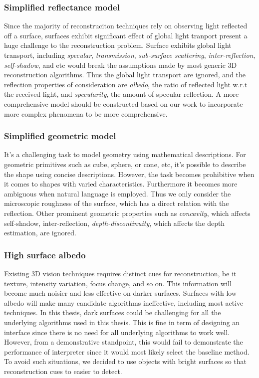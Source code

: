 \subsubsection{Simplified reflectance model}
Since the majority of reconstruciton techniques rely on observing light reflected off a surface, surfaces exhibit significant effect of global light tranport present a huge challenge to the reconstruction problem. Surface exhibits global light transport, including \textit{specular}, \textit{transmission}, \textit{sub-surface scattering}, \textit{inter-reflection}, \textit{self-shadow}, and etc would break the assumptions made by most generic 3D reconstruction algorithms. Thus the global light transport are ignored, and the reflection properties of consideration are \textit{albedo}, \ie the ratio of reflected light w.r.t the received light, and \textit{specularity}, \ie the amount of specular reflection. A more comprehensive model should be constructed based on our work to incorporate more complex phenomena to be more comprehensive.

\subsubsection{Simplified geometric model}
It's a challenging task to model geometry using mathematical descriptions. For geometric primitives such as cube, sphere, or cone, etc, it's possible to describe the shape using concise descriptions. However, the task becomes prohibitive when it comes to shapes with varied characteristics. Furthermore it becomes more ambiguous when natural language is employed. Thus we only consider the microscopic roughness of the surface, which has a direct relation with the reflection. Other prominent geometric properties such as \textit{concavity}, which affects self-shadow, inter-reflection, \textit{depth-discontinuity}, which affects the depth estimation, are ignored.

\subsubsection{High surface albedo}
Existing 3D vision techniques requires distinct cues for reconstruction, be it texture, intensity variation, focus change, and so on. This information will become much noisier and less effective on darker surfaces. Surfaces with low albedo will make many candidate algorithms ineffective, including most active techniques. In this thesis, dark surfaces could be challenging for all the underlying algorithms used in this thesis. This is fine in term of designing an interface since there is no need for all underlying algorithms to work well. However, from a demonstrative standpoint, this would fail to demonstrate the performance of interpreter since it would most likely select the baseline method. To avoid such situations, we decided to use objects with bright surfaces so that reconstruction cues to easier to detect.

